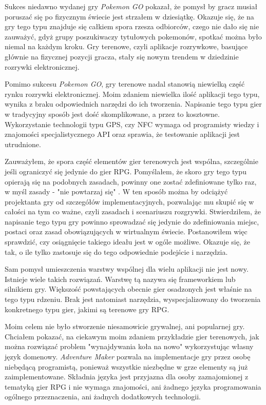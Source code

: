\documentclass[openright]{xmgr}
\begin{document}
Sukces niedawno wydanej gry \textit{Pokemon GO} pokazał, że pomysł by gracz musiał poruszać się po fizycznym świecie jest strzałem w dziesiątkę. Okazuje się, że na gry tego typu znajduje się całkiem spora rzesza odbiorców, czego nie dało się nie zauważyć, gdyż grupy poszukiwaczy tytułowych pokemonów, spotkać można było niemal na każdym kroku. Gry terenowe, czyli aplikacje rozrywkowe, basujące głównie na fizycznej pozycji gracza, stały się nowym trendem w dziedzinie rozrywki elektronicznej.

Pomimo sukcesu \textit{Pokemon GO}, gry terenowe nadal stanowią niewielką część rynku rozrywki elektronicznej. Moim zdaniem niewielka ilość aplikacji tego typu, wynika z braku odpowiednich narzędzi do ich tworzenia. Napisanie tego typu gier w tradycyjny sposób jest dość skomplikowane, a przez to kosztowne. Wykorzystanie technologii typu GPS, czy NFC wymaga od programisty wiedzy i znajomości specjalistycznego API oraz sprawia, że testowanie aplikacji jest utrudnione.

Zauważyłem, że spora część elementów gier terenowych jest wspólna, szczególnie jeśli ograniczyć się jedynie do gier RPG. Pomyślałem, że skoro gry tego typu opierają się na podobnych zasadach, powinny one zostać zdefiniowane tylko raz, w myśl zasady - "nie powtarzaj się" \cite{CleanCode:2005}. W ten sposób można by odciążyć projektanta gry od szczegółów implementacyjnych, pozwalając mu skupić się w całości na tym co ważne, czyli zasadach i scenariuszu rozgrywki. Stwierdziłem, że napisanie tego typu gry powinno sprowadzać się jedynie do zdefiniowania miejsc, postaci oraz zasad obowiązujących w wirtualnym świecie. Postanowiłem więc sprawdzić, czy osiągnięcie takiego ideału jest w ogóle możliwe. Okazuje się, że tak, o ile tylko zastosuje się do tego odpowiednie podejście i narzędzia.

Sam pomysł umieszczenia warstwy wspólnej dla wielu aplikacji nie jest nowy. Istnieje wiele takich rozwiązań. Warstwę tą nazywa się frameworkiem lub silnikiem gry. Większość powstających obecnie gier osadzonych jest właśnie na tego typu rdzeniu. Brak jest natomiast narzędzia, wyspecjalizowany do tworzenia konkretnego typu gier, jakimi są terenowe gry RPG.

Moim celem nie było stworzenie niesamowicie grywalnej, ani popularnej gry. Chciałem pokazać, na ciekawym moim zdaniem przykładzie gier terenowych, jak można rozwiązać problem "wynajdywania koła na nowo" wykorzystując własny język domenowy. \textit{Adventure Maker} pozwala na implementacje gry przez osobę niebędącą programistą, ponieważ wszystkie niezbędne w grze elementy są już zaimplementowane. Składnia języka jest przyjazna dla osoby zaznajomionej z tematyką gier RPG i nie wymaga znajomości, ani żadnego języka programowania ogólnego przeznaczenia, ani żadnych dodatkowych technologii.
\end{document}
